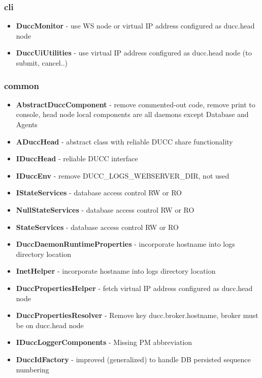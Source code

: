 \documentclass[letterpaper]{article}
\begin{document}
\subsubsection{cli}

{\renewcommand\labelitemi{}
\begin{itemize}
  \item \textbf{DuccMonitor} - use WS node or virtual IP address configured as ducc.head node
  \item \textbf{DuccUiUtilities} - use virtual IP address configured as ducc.head node (to submit, cancel..)
\end{itemize}
}

\subsubsection{common}

{\renewcommand\labelitemi{}
\begin{itemize}
  \item \textbf{AbstractDuccComponent} - remove commented-out code, remove print to console, head node local components are all daemons except Database and Agents
  \item \textbf{ADuccHead} - abstract class with reliable DUCC share functionality
  \item \textbf{IDuccHead} - reliable DUCC interface
  \item \textbf{IDuccEnv} - remove DUCC\_LOGS\_WEBSERVER\_DIR, not used
  \item \textbf{IStateServices} - database access control RW or RO
  \item \textbf{NullStateServices} - database access control RW or RO
  \item \textbf{StateServices} - database access control RW or RO
  \item \textbf{DuccDaemonRuntimeProperties} - incorporate hostname into logs directory location
  \item \textbf{InetHelper} - incorporate hostname into logs directory location
  \item \textbf{DuccPropertiesHelper} - fetch virtual IP address configured as ducc.head node
  \item \textbf{DuccPropertiesResolver} - Remove key ducc.broker.hostname, broker must be on ducc.head node
  \item \textbf{IDuccLoggerComponents} - Missing PM abbreviation
  \item \textbf{DuccIdFactory} - improved (generalized) to handle DB persisted sequence numbering
\end{itemize}
}
\end{document}

